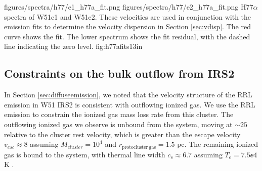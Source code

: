 
\FigureTwo
{figures/spectra/h77/e1_h77a_fit.png}
{figures/spectra/h77/e2_h77a_fit.png}
{H77$\alpha$ spectra of W51e1 and W51e2.  These velocities are used in
conjunction with the \formaldehyde emission fits to determine the velocity
dispersion in Section \ref{sec:vdisp}.
The red curve shows the fit.  The lower spectrum shows the fit residual, with
the dashed line indicating the zero level.  
}
{fig:h77afits}{1}{3in}

\subsection{Constraints on the bulk outflow from IRS2}
\label{sec:irs2outflow}
In Section \ref{sec:diffuseemission}, we noted that the velocity structure of
the RRL emission in W51 IRS2 is consistent with outflowing ionized gas.  We use
the RRL emission to constrain the ionized gas mass loss rate from this cluster.
The outflowing ionized gas we observe is unbound from the system, moving at
$\sim25$ \kms relative to the cluster rest velocity, which is greater than the
escape velocity $v_{esc}\approx8$ \kms assuming $M_{cluster}=10^4$ \msun and
$r_{\mathrm{protocluster~gas}}=1.5$ pc.  The remaining ionized gas is bound to the system, with
thermal line width $c_s\approx6.7$ \kms assuming $T_e=7.5\ee{4}$ K \citep{Ginsburg2015a}.

